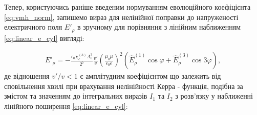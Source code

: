 Тепер, користуючись раніше введеним нормуванням еволюційного коефіцієнта 
\eqref{eq:vmh_norm}, запишемо вираз для нелінійної поправки до напруженості 
електричного поля $ E'_\rho $ в зручному для порівняння з лінійним наближенням
\eqref{eq:linear_e_cyl} вигляді:


%

\begin{equation} \begin{aligned} \label{eq:erho_kerr}
E'_\rho = - \frac{\epsilon_0 \chi_e^{(3)} A_0^3}{2^7}
\frac{v'}{v}
\left( \frac{\mu_0 \mu}{\epsilon_0 \epsilon} \right)^2
\left(\hat{E}_\rho^{(1)} \cos \varphi +
\hat{E}_\rho^{(3)} \cos 3 \varphi \right),
\end{aligned} \end{equation}
%
де відношення $ v'/v < 1 $ є амплітудним коефіцієнтом що залежить від 
сповільнення хвилі при врахування нелінійності Керра - функція, подібна 
за змістом та значенням до інтегральних виразів $ I_1 $ та $ I_2 $ з 
розв'язку у наближенні лінійного поширення \eqref{eq:linear_e_cyl}:

